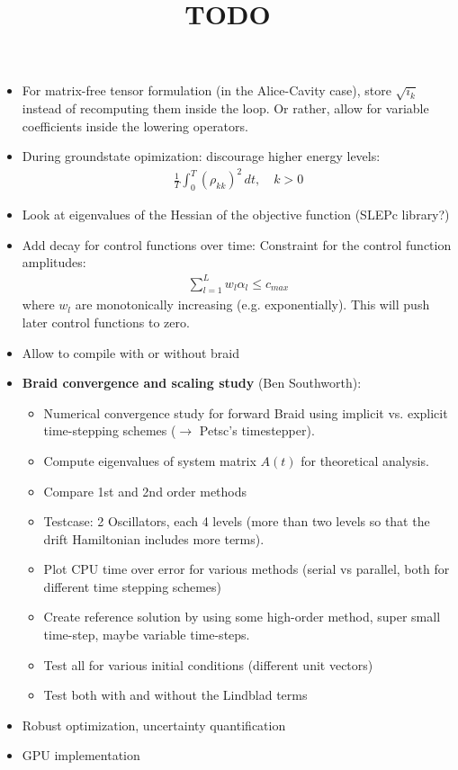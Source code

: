 \documentclass{article}
\title{TODO}
\begin{document}
\maketitle

\begin{itemize}
  \item For matrix-free tensor formulation (in the Alice-Cavity case), store $\sqrt{i_k}$ instead of recomputing them inside the loop. Or rather, allow for variable coefficients inside the lowering operators. 
  \item During groundstate opimization: discourage higher energy levels:
     \begin{align*}
        \frac 1 T \int_0^T \left( \rho_{kk}\right)^2 \, dt, \quad k > 0
     \end{align*}
  \item Look at eigenvalues of the Hessian of the objective function (SLEPc library?)
  \item Add decay for control functions over time: Constraint for the control function amplitudes:
      \begin{align*}
          \sum_{l=1}^L w_l\alpha_l \leq c_{max}
      \end{align*}
        where $w_l$ are monotonically increasing (e.g. exponentially). This will push later control functions to zero. 
  \item Allow to compile with or without braid
  \item \textbf{Braid convergence and scaling study} (Ben Southworth):
        \begin{itemize}
          \item Numerical convergence study for forward Braid using implicit vs. explicit time-stepping schemes ($\rightarrow$ Petsc's timestepper).
          \item Compute eigenvalues of system matrix $A(t)$ for theoretical analysis. 
          \item Compare 1st and 2nd order methods
          \item Testcase: 2 Oscillators, each 4 levels (more than two levels so that the drift Hamiltonian includes more terms). 
          \item Plot CPU time over error for various methods (serial vs parallel, both for different time stepping schemes)
          \item Create reference solution by using some high-order method, super small time-step, maybe variable time-steps. 
          \item Test all for various initial conditions (different unit vectors)
          \item Test both with and without the Lindblad terms
        \end{itemize}  
  \item Robust optimization, uncertainty quantification
  \item GPU implementation
\end{itemize}
\end{document}
